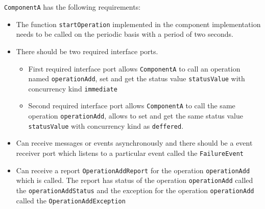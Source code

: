 \texttt{ComponentA} has the following requirements:
\begin{itemize}
\item The function \texttt{startOperation} implemented in the component implementation needs to be called on the periodic basis with a period of two seconds.

\item There should be two required interface ports. 
\begin{itemize}
\item First required interface port allows \texttt{ComponentA} to call an operation named \texttt{operationAdd}, set and get the status value \texttt{statusValue} with concurrency kind \texttt{immediate}
\item Second required interface port allows \texttt{ComponentA} to call the same operation \texttt{operationAdd}, allows to set and get the same status value \texttt{statusValue} with concurrency kind as \texttt{deffered}. 
\end{itemize}

\item Can receive messages or events asynchronously and there should be a event receiver port which listens to a particular event called the \texttt{FailureEvent} 

\item Can receive a report \texttt{OperationAddReport} for the operation \texttt{operationAdd} which is called. The report has status of the operation \texttt{operationAdd} called the \texttt{operationAddStatus} and the exception for the operation \texttt{operationAdd} called the \texttt{OperationAddException} 
\end{itemize}

